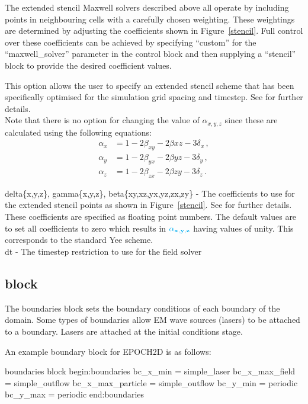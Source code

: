 The extended stencil Maxwell solvers described above all operate by
including points in neighbouring cells with a carefully chosen weighting.
These weightings are determined by adjusting the coefficients shown in
Figure~\ref{stencil}. Full control over these coefficients can be
achieved by specifying ``custom'' for the ``maxwell\_solver'' parameter
in the control block and then supplying a ``stencil'' block to provide
the desired coefficient values.

This option allows the user to specify an extended stencil scheme that
has been specifically optimised for the simulation grid spacing and timestep.
See \citet{Blinne2017} for further details.\\

Note that there is no option for changing the value of $\alpha_{x,y,z}$ since
these are calculated using the following  equations:
\begin{align*}
  \alpha_x &= 1 - 2\beta_{xy} - 2\beta{xz} - 3\delta_x\,, \\
  \alpha_y &= 1 - 2\beta_{yx} - 2\beta{yz} - 3\delta_y\,, \\
  \alpha_z &= 1 - 2\beta_{zx} - 2\beta{zy} - 3\delta_z\,.
\end{align*}

{\emphtext delta\{x,y,z\}, gamma\{x,y,z\}, beta\{xy,xz,yx,yz,zx,zy\}} -
  The coefficients to use for the extended stencil points as shown in
  Figure~\ref{stencil}. See \citet{Blinne2017} for further details. These
  coefficients are specified as floating point numbers. The default values
  are to set all coefficients to zero which results in
  $\inlineemph{\alpha_{x,y,z}}$ having values of unity. This corresponds to
  the standard Yee scheme.\\

{\emphtext dt} - The timestep restriction to use for the field solver\\


\subsection{\texorpdfstring
  { block}
  {           {boundaries} block}}
\label{sec:boundaries_block}
The {\emphtext boundaries} block sets the boundary conditions of each boundary
of the domain. Some types of boundaries allow EM wave sources (lasers) to be
attached to a boundary. Lasers are attached at the initial conditions
stage.

An example boundary block for EPOCH2D is as follows:
\begin{lboxverbatim}{boundaries block}
begin:boundaries
   bc_x_min = simple_laser
   bc_x_max_field = simple_outflow
   bc_x_max_particle = simple_outflow
   bc_y_min = periodic
   bc_y_max = periodic
end:boundaries
\end{lboxverbatim}

